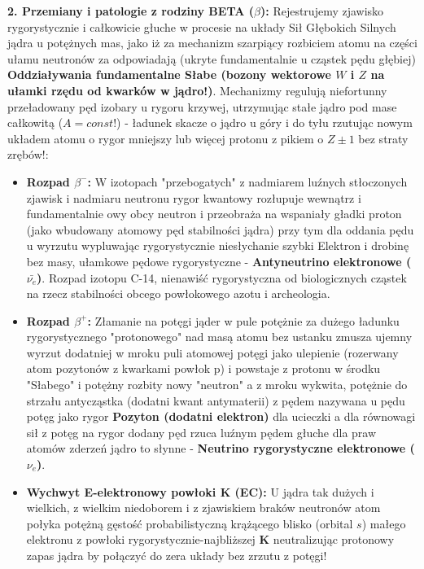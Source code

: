 \documentclass[11pt, a4paper]{article}
\begin{document}
\textbf{2. Przemiany i patologie z rodziny BETA ($\beta$):}
Rejestrujemy zjawisko rygorystycznie i całkowicie głuche w procesie na układy Sił Głębokich Silnych jądra u potężnych mas, jako iż za mechanizm szarpiący rozbiciem atomu na części ułamu neutronów za odpowiadają (ukryte fundamentalnie u cząstek pędu głębiej) \textbf{Oddziaływania fundamentalne Słabe (bozony wektorowe $W$ i $Z$ na ułamki rzędu od kwarków w jądro!)}. Mechanizmy regulują niefortunny przeładowany pęd izobary u rygoru krzywej, utrzymując stałe jądro pod mase całkowitą ($A=const$!) - ładunek skacze o jądro u góry i do tyłu rzutując nowym układem atomu o rygor mniejszy lub więcej protonu z pikiem o $Z \pm 1$ bez straty zrębów!:
\begin{itemize}
    \item \textbf{Rozpad $\beta^-$:} W izotopach "przebogatych" z nadmiarem luźnych stłoczonych zjawisk i nadmiaru neutronu rygor kwantowy rozłupuje wewnątrz i fundamentalnie owy obcy neutron i przeobraża na wspaniały gładki proton (jako wbudowany atomowy pęd stabilności jądra) przy tym dla oddania pędu u wyrzutu wypluwając rygorystycznie niesłychanie szybki Elektron i drobinę bez masy, ułamkowe pędowe rygorystyczne - \textbf{Antyneutrino elektronowe ($\bar{\nu_e}$)}. Rozpad izotopu C-14, nienawiść rygorystyczna od biologicznych cząstek na rzecz stabilności obcego powłokowego azotu i archeologia.
    \item \textbf{Rozpad $\beta^+$:} Złamanie na potęgi jąder w pule potężnie za dużego ładunku rygorystycznego "protonowego" nad masą atomu bez ustanku zmusza ujemny wyrzut dodatniej w mroku puli atomowej potęgi jako ulepienie (rozerwany atom pozytonów z kwarkami powłok p) i powstaje z protonu w środku "Słabego" i potężny rozbity nowy "neutron" a z mroku wykwita, potężnie do strzału antycząstka (dodatni kwant antymaterii) z pędem nazywana u pędu potęg jako rygor \textbf{Pozyton (dodatni elektron)} dla ucieczki a dla równowagi sił z potęg na rygor dodany pęd rzuca luźnym pędem głuche dla praw atomów zderzeń jądro to słynne - \textbf{Neutrino rygorystyczne elektronowe ($\nu_e$)}.
    \item \textbf{Wychwyt E-elektronowy powłoki K (EC):} U jądra tak dużych i wielkich, z wielkim niedoborem i z zjawiskiem braków neutronów atom połyka potężną gęstość probabilistyczną krążącego blisko (orbital $s$) małego elektronu z powłoki rygorystycznie-najbliższej \textbf{K} neutralizując protonowy zapas jądra by połączyć do zera układy bez zrzutu z potęgi! 
\end{itemize}
\end{document}
